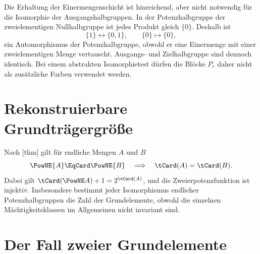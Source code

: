 \documentclass[main.tex]{subfiles}
\begin{document}
Die Erhaltung der Einermengenschicht ist hinreichend, aber nicht notwendig
für die Isomorphie der Ausgangshalbgruppen.  In der Potenzhalbgruppe der
zweielementigen Nullhalbgruppe ist jedes Produkt gleich \(\{0\}\).  Deshalb
ist
\[
  \{1\}\longleftrightarrow\{0,1\},
  \qquad \{0\}\longmapsto\{0\},
\]
ein Automorphismus der Potenzhalbgruppe, obwohl er eine Einermenge mit einer
zweielementigen Menge vertauscht.  Ausgangs- und Zielhalbgruppe sind dennoch
identisch.  Bei einem abstrakten Isomorphietest dürfen die Blöcke \(P_r\)
daher nicht als zusätzliche Farben verwendet werden.

\section{Rekonstruierbare Grundträgergröße}

Nach
[thm]
gilt für endliche Mengen \(A\) und \(B\)
\[
  \PowNE{A}\EqCard\PowNE{B}
  \quad\Longrightarrow\quad
  \tCard(A)=\tCard(B).
\]
Dabei gilt
\(\tCard(\PowNE A)+1=2^{\tCard(A)}\), und die
Zweierpotenzfunktion ist injektiv.  Insbesondere bestimmt jeder Isomorphismus endlicher
Potenzhalbgruppen die Zahl der Grundelemente, obwohl die einzelnen
Mächtigkeitsklassen im Allgemeinen nicht invariant sind.

\section{Der Fall zweier Grundelemente}
\end{document}
